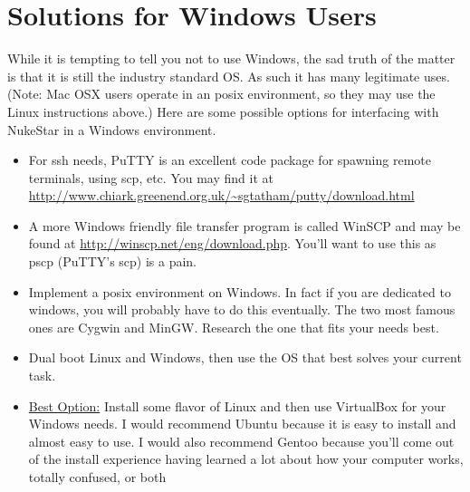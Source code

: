 \documentclass[a4paper, 12pt]{article}
\begin{document}
\section{Solutions for Windows Users}
While it is tempting to tell you not to use Windows, the sad truth of the matter is that it is 
still the industry standard OS.  As such it has many legitimate uses.  (Note: Mac OSX users operate in an 
posix environment, so they may use the Linux instructions above.)  Here are some possible options for interfacing 
with NukeStar in a Windows environment.
\begin{itemize}
    \item For ssh needs, PuTTY is an excellent code package for spawning remote terminals, using scp, etc.
        You may find it at \url{http://www.chiark.greenend.org.uk/~sgtatham/putty/download.html}
    \item A more Windows friendly file transfer program is called WinSCP and may be found at 
        \url{http://winscp.net/eng/download.php}.  You'll want to use this as pscp (PuTTY's scp) 
        is a pain.
    \item Implement a posix environment on Windows. In fact if you are dedicated to windows, you will 
        probably have to do this eventually.  The two most famous ones are Cygwin and MinGW.  
        Research the one that fits your needs best.
    \item Dual boot Linux and Windows, then use the OS that best solves your current task.
    \item \underline{Best Option:} Install some flavor of Linux and then use VirtualBox for your Windows needs.
        I would recommend Ubuntu because it is easy to install and almost easy to use.  
        I would also recommend Gentoo because you'll come out of the install experience having
        learned a lot about how your computer works, totally confused, or both
\end{itemize}
\end{document}
